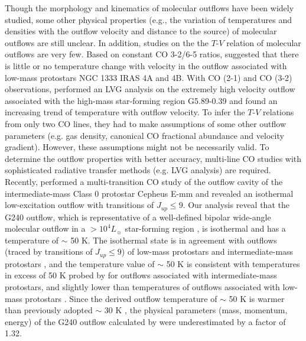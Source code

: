 Though the morphology and kinematics of molecular outflows have been widely studied, some other physical properties (e.g., the variation of temperatures and densities with the outflow velocity and distance to the source) of molecular outflows are still unclear. In addition, studies on the the $T$-$V$ relation of molecular outflows are very few. Based on constant CO 3-2/6-5 ratios, \citet{2012A&A...542A..86Y} suggested that there is little or no temperature change with velocity in the outflow associated with low-mass protostars NGC 1333 IRAS 4A and 4B. With CO (2-1) and CO (3-2) observations, \citet{2012ApJ...744L..26S} performed an LVG analysis on the extremely high velocity outflow associated with the high-mass star-forming region G5.89-0.39 and found an increasing trend of temperature with outflow velocity. To infer the $T$-$V$ relations from only two CO lines, they had to make assumptions of some other outflow parameters (e.g. gas density, canonical CO fractional abundance and velocity gradient). However, these assumptions might not be necessarily valid. To determine the outflow properties with better accuracy, multi-line CO studies with sophisticated radiative transfer methods (e.g. LVG analysis) are required. Recently, \citet{2015A&A...581A...4L} performed a multi-transition CO study of the outflow cavity of the intermediate-mass Class 0 protostar Cepheus E-mm and revealed an isothermal low-excitation outflow with transitions of $J_{up} \le 9$. Our analysis reveal that the G240 outflow, which is representative of a well-defined bipolar wide-angle molecular outflow in a $> 10^4 L_\sun$ star-forming region \citep{2009ApJ...696...66Q}, is isothermal and has a temperature of $\sim$ 50 K. The isothermal state is in agreement with outflows (traced by transitions of $J_{up} \le 9$) of low-mass protostars and intermediate-mass protostars \citep{2012A&A...542A..86Y, 2015A&A...581A...4L}, and the temperature value of $\sim$ 50 K is consistent with temperatures in excess of 50 K probed by \citet{2016A&A...587A..17V} for outflows associated with intermediate-mass protostars, and slightly lower than temperatures of outflows associated with low-mass protostars \citep{2009A&A...501..633V, 2012A&A...542A..86Y}. Since the derived outflow temperature of $\sim$ 50 K is warmer than previously adopted $\sim$ 30 K \citep{2009ApJ...696...66Q}, the physical parameters (mass, momentum, energy) of the G240 outflow calculated by \citet{2009ApJ...696...66Q} were underestimated by a factor of 1.32.  

